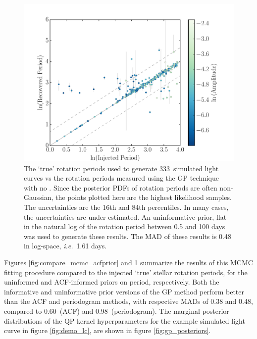 \documentclass[useAMS, usenatbib, preprint, 12pt]{aastex}
\newcommand{\naigrain}{333}
\newcommand{\ie}{{\it i.e.}}
\newcommand{\acfRMS}{0.60}
\newcommand{\pgramRMS}{0.98}
\begin{document}
\begin{figure}
\begin{center}
\includegraphics[width=6in, clip=true]{figures/comparison_noprior.pdf}
\caption{The `true' rotation periods used to generate \naigrain\
simulated light curves vs the rotation periods measured using the GP
technique with no .
Since the posterior PDFs of rotation periods are often non-Gaussian,
the points plotted here are the highest likelihood samples.
The uncertainties are the 16th and 84th percentiles.
In many cases, the uncertainties are under-estimated.
An uninformative prior, flat in the natural log of the rotation period between
    0.5 and 100 days was used to generate these results.
The MAD of these results is 0.48 in log-space, \ie\ 1.61 days.
    }
\label{fig:compare_mcmc_noprior}
\end{center}
\end{figure}

Figures \ref{fig:compare_mcmc_acfprior} and \ref{fig:compare_mcmc_noprior}
summarize the results of this MCMC fitting procedure compared to the injected
`true' stellar rotation periods, for the uninformed and ACF-informed priors on
period, respectively.
Both the informative and uninformative prior versions of the GP method perform
better than the ACF and periodogram methods, with respective MADs of 0.38 and
0.48, compared to \acfRMS\ (ACF) and \pgramRMS\ (periodogram).
The marginal posterior distributions of the QP kernel hyperparameters for the
example simulated light curve in figure \ref{fig:demo_lc}, are shown in
figure \ref{fig:gp_posteriors}.
\end{document}
